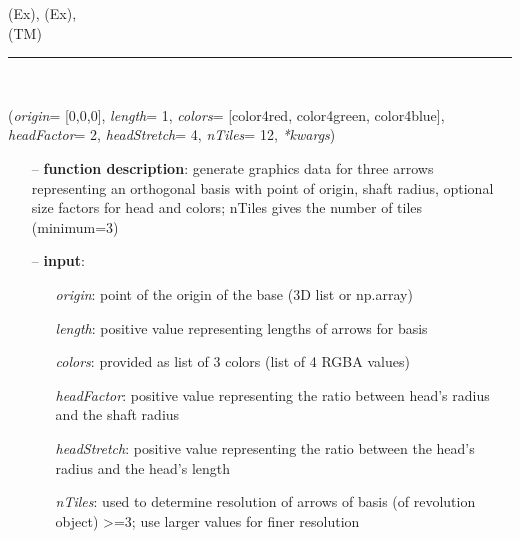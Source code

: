 \begin{itemize}[leftmargin=1.4cm]
\begin{itemize}[leftmargin=0.5cm]
\begin{itemize}[leftmargin=1.4cm]
\begin{itemize}[leftmargin=1.4cm]
\begin{itemize}[leftmargin=0.5cm]
\begin{itemize}[leftmargin=1.4cm]
\begin{itemize}[leftmargin=0.5cm]
 (Ex), 
 (Ex), 
\\  (TM)\ei

%
\noindent\rule{8cm}{0.75pt}\vspace{1pt} \\ 
\begin{flushleft}
\label{sec:graphicsDataUtilities:GraphicsDataBasis}
({\it origin}= [0,0,0], {\it length}= 1, {\it colors}= [color4red, color4green, color4blue], {\it headFactor}= 2, {\it headStretch}= 4, {\it nTiles}= 12, {\it **kwargs})
\end{flushleft}
\setlength{\itemindent}{0.7cm}
\begin{itemize}[leftmargin=0.7cm]
  \item[--]  {\bf function description}: generate graphics data for three arrows representing an orthogonal basis with point of origin, shaft radius, optional size factors for head and colors; nTiles gives the number of tiles (minimum=3)  \item[--]  {\bf input}: \vspace{-6pt}
  \begin{itemize}[leftmargin=1.2cm]
\setlength{\itemindent}{-0.7cm}
    \item[] {\it origin}: point of the origin of the base (3D list or np.array)
    \item[] {\it   length}: positive value representing lengths of arrows for basis
    \item[] {\it   colors}: provided as list of 3 colors (list of 4 RGBA values)
    \item[] {\it   headFactor}: positive value representing the ratio between head's radius and the shaft radius
    \item[] {\it   headStretch}: positive value representing the ratio between the head's radius and the head's length
    \item[] {\it   nTiles}: used to determine resolution of arrows of basis (of revolution object) >=3; use larger values for finer resolution

\end{itemize}
\end{itemize}
\end{itemize}
\end{itemize}
\end{itemize}
\end{itemize}
\end{itemize}
\end{itemize}
\end{itemize}

